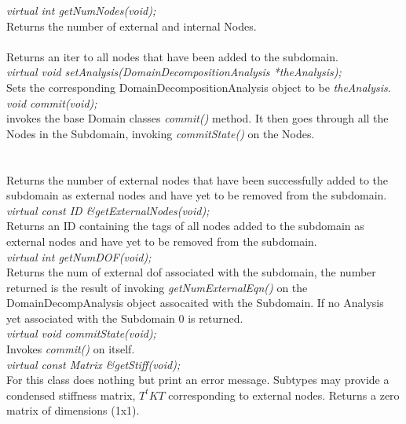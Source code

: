 {\em virtual int getNumNodes(void); } \\
Returns the number of external and internal Nodes. \\

 \\
Returns an iter to all nodes that have been added to the subdomain. \\

{\em virtual void setAnalysis(DomainDecompositionAnalysis *theAnalysis);}\\
Sets the corresponding DomainDecompositionAnalysis object to be {\em
theAnalysis}. \\

{\em void commit(void);} \\
invokes the base Domain classes {\em commit()} method. It then goes through
all the Nodes in the Subdomain, invoking {\em commitState()} on the Nodes. \\


 \\
\\
Returns the number of external nodes that have been successfully added
to the subdomain as external nodes and have yet to be removed from the
subdomain. \\ 

{\em virtual const ID \&getExternalNodes(void);}\\
Returns an ID containing the tags of all nodes added to the subdomain
as external nodes and have yet to be removed from the subdomain. \\

{\em virtual int getNumDOF(void);}\\
Returns the num of external dof associated with the subdomain, the number
returned is the result of invoking {\em getNumExternalEqn()} on
the DomainDecompAnalysis object assocaited with the Subdomain. If
no Analysis yet associated with the Subdomain $0$ is returned. \\

{\em virtual void commitState(void);}\\ 
Invokes {\em commit()} on itself. \\
    
{\em virtual const Matrix \&getStiff(void);}\\
For this class does nothing but print an error message. Subtypes may
provide a condensed stiffness matrix, $T^tKT$ corresponding to
external nodes. Returns a zero matrix of dimensions (1x1). \\

